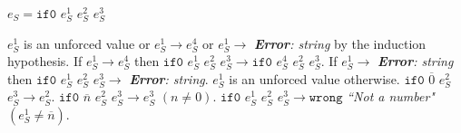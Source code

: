\begin{case}

$e_{S}=\mathtt{if0}$ $e_{S}^{1}$ $e_{S}^{2}$ $e_{S}^{3}$

$e_{S}^{1}$ is an unforced value or $e_{S}^{1}\rightarrow e_{S}^{4}$ or $e_{S}^{1}\rightarrow$ \emph{\textbf{Error}: string} by the induction hypothesis.  If $e_{S}^{1}\rightarrow e_{S}^{4}$ then $\mathtt{if0}$ $e_{S}^{1}$ $e_{S}^{2}$ $e_{S}^{3}\rightarrow \mathtt{if0}$ $e_{S}^{4}$ $e_{S}^{2}$ $e_{S}^{3}$.  If $e_{S}^{1}\rightarrow$ \emph{\textbf{Error}: string} then $\mathtt{if0}$ $e_{S}^{1}$ $e_{S}^{2}$ $e_{S}^{3}\rightarrow$ \emph{\textbf{Error}: string}.  $e_{S}^{1}$ is an unforced value otherwise.  $\mathtt{if0}$ $\overline{0}$ $e_{S}^{2}$ $e_{S}^{3}\rightarrow e_{S}^{2}$.  $\mathtt{if0}$ $\overline{n}$ $e_{S}^{2}$ $e_{S}^{3}\rightarrow e_{S}^{3}$ $(n\neq 0)$.  $\mathtt{if0}$ $e_{S}^{1}$ $e_{S}^{2}$ $e_{S}^{3}\rightarrow\mathtt{wrong}$ \emph{``Not a number"} $(e_{S}^{1}\neq\overline{n})$.

\end{case}